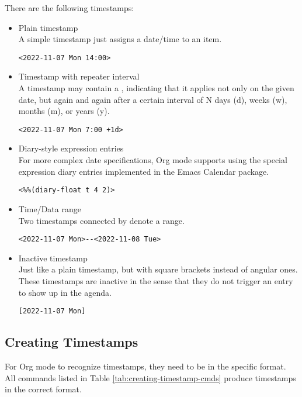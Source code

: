 There are the following timestamps:
\begin{itemize}
\item Plain timestamp\\
  A simple timestamp just assigns a date/time to an item.
\begin{verbatim}
<2022-11-07 Mon 14:00>
\end{verbatim}
\item Timestamp with repeater interval\\
  A timestamp may contain a , indicating that it applies not only on the given date, but again and again after a certain interval of N days (d), weeks (w), months (m), or years (y).
\begin{verbatim}
<2022-11-07 Mon 7:00 +1d>
\end{verbatim}
\item Diary-style expression entries\\
  For more complex date specifications, Org mode supports using the special expression diary entries implemented in the Emacs Calendar package.
\begin{verbatim}
<%%(diary-float t 4 2)>
\end{verbatim}
\item Time/Data range\\
  Two timestamps connected by \keyword{-{}-} denote a range.
\begin{verbatim}
<2022-11-07 Mon>--<2022-11-08 Tue>
\end{verbatim}
\item Inactive timestamp\\
  Just like a plain timestamp, but with square brackets instead of angular ones.
  These timestamps are inactive in the sense that they do not trigger an entry to show up in the agenda.
\begin{verbatim}
[2022-11-07 Mon]
\end{verbatim}
\end{itemize}


\subsection{Creating Timestamps}
\label{sec:creating-timestamps}

For Org mode to recognize timestamps, they need to be in the specific format. All commands listed in Table \ref{tab:creating-timestamp-cmds} produce timestamps in the correct format.

